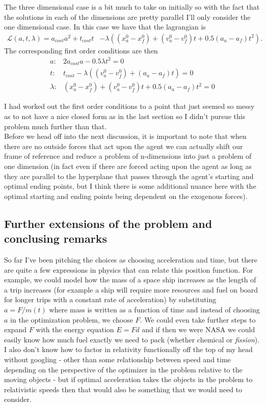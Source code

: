 \documentclass[11pt,english]{article}
\begin{document}
\noindent The three dimensional case is a bit much to take on initially so with the fact that the solutions in each of the dimensions are pretty parallel I'll only consider the one dimensional case. In this case we have that the lagrangian is
\begin{align*}
	\mathcal{L}(a,t,\lambda) = a_{cost}a^2 + t_{cost}t &- \lambda((x_{a}^0 - x_{f}^0) + (v_a^0-v_f^0)t + 0.5(a_a - a_f)t^2).
\end{align*}
The corresponding first order conditions are then
\begin{align*}
a:& 2a_{cost}a - 0.5\lambda t^2 = 0\\
t:& t_{cost} - \lambda((v_a^0-v_f^0) + (a_a - a_f)t) = 0\\
\lambda:& (x_{a}^0 - x_{f}^0) + (v_a^0-v_f^0)t + 0.5(a_a - a_f)t^2 = 0
\end{align*}

\noindent I had worked out the first order conditions to a point that just seemed so messy as to not have a nice closed form as in the last section so I didn't pursue this problem much further than that.\\

\noindent Before we head off into the next discussion, it is important to note that when there are no outside forces that act upon the agent we can actually shift our frame of reference and reduce a problem of n-dimensions into just a problem of one dimension (in fact even if there are forced acting upon the agent as long as they are parallel to the hyperplane that passes through the agent's starting and optimal ending points, but I think there is some additional nuance here with the optimal starting and ending points being dependent on the exogenous forces).

\subsection*{Further extensions of the problem and conclusing remarks}

So far I've been pitching the choices as choosing acceleration and time, but there are quite a few expressions in physics that can relate this position function. For example, we could model how the mass of a space ship increases as the length of a trip increases (for example a ship will require more resources and fuel on board for longer trips with a constant rate of acceleration) by substituting $a = F/m(t)$ where mass is written as a function of time and instead of choosing $a$ in the optimization problem, we choose $F$. We could even take further steps to expand $F$ with the energy equation $E = Fd$ and if then we were NASA we could easily know how much fuel exactly we need to pack (whether chemical or \textit{fission}). I also don't know how to factor in relativity functionally off the top of my head without googling - other than some relationship between speed and time depending on the perspective of the optimizer in the problem relative to the moving objects - but if optimal acceleration takes the objects in the problem to relativistic speeds then that would also be something that we would need to consider.\\
\end{document}
